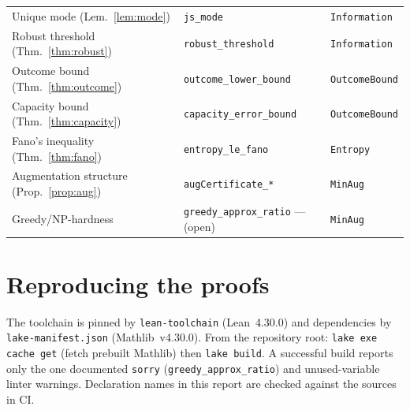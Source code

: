 \documentclass[11pt]{article}
\newcommand{\lean}[1]{\texttt{#1}}           %
\theoremstyle{plain}
\theoremstyle{definition}
\begin{document}
\begin{center}
\begin{tabular}{lll}
Unique mode (Lem.~\ref{lem:mode})                   & \lean{js\_mode}                  & \lean{Information} \\
Robust threshold (Thm.~\ref{thm:robust})            & \lean{robust\_threshold}         & \lean{Information} \\
Outcome bound (Thm.~\ref{thm:outcome})              & \lean{outcome\_lower\_bound}     & \lean{OutcomeBound} \\
Capacity bound (Thm.~\ref{thm:capacity})            & \lean{capacity\_error\_bound}    & \lean{OutcomeBound} \\
Fano's inequality (Thm.~\ref{thm:fano})             & \lean{entropy\_le\_fano}         & \lean{Entropy} \\
Augmentation structure (Prop.~\ref{prop:aug})       & \lean{augCertificate\_*}         & \lean{MinAug} \\
Greedy/NP-hardness                                  & \lean{greedy\_approx\_ratio} --- (open) & \lean{MinAug} \\
\hline
\end{tabular}
\end{center}

\section*{Reproducing the proofs}
The toolchain is pinned by \texttt{lean-toolchain} (Lean~4.30.0) and dependencies by
\texttt{lake-manifest.json} (Mathlib~v4.30.0). From the repository root:
\texttt{lake exe cache get} (fetch prebuilt Mathlib) then \texttt{lake build}. A successful
build reports only the one documented \texttt{sorry} (\lean{greedy\_approx\_ratio}) and
unused-variable linter warnings. Declaration names in this report are checked against the
sources in CI.
\end{document}
